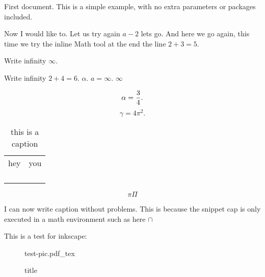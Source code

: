 \documentclass{article}
\newcommand{\incfig}[1]{%
    \def\svgwidth{\columnwidth}
    {#1.pdf_tex}
}
\begin{document}
First document. This is a simple example, with no 
extra parameters or packages included.

Now I would like to.
Let us try again $a-2$ lets go. And here we go again, this time we try the inline Math tool at the end
the line $2+3=5$.

Write infinity $\infty$.

Write infinity $2+4=6$.
$\alpha$. $a = \infty$. $ \infty $ 

\[
\alpha = \frac{3}{4}\\
.\] 
\[
\gamma = 4\pi ^{2} 
.\] 

\begin{table}[h]
    \centering
    \begin{tabular}{c|c}
            hey &  you \\
             &   \\
             &   \\
             &   \\
             &   \\
    \end{tabular}
    \caption{this is a caption}
    \label{tab:first}
\end{table}

\[
    \pi \Pi 
\]

I can now write caption without problems. This is because the snippet cap is only executed in
a math environment such as here \(\cap \) 

This is a test for inkscape:

\begin{figure}[h]
    \centering
    \incfig{test-pic}
    \caption{title}
    \label{fig:test-pic}
\end{figure}
\end{document}
